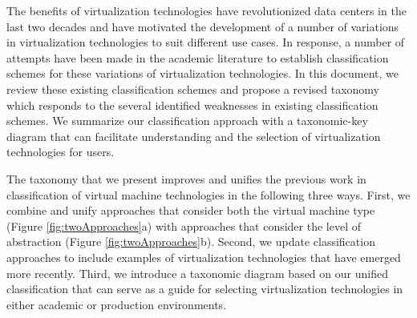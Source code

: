 	
    The benefits of virtualization technologies have revolutionized data centers in the last two decades and have motivated the development of a number of variations in virtualization technologies \cite{Kampert2010} to suit different use cases.  In response, a number of attempts have been made in the academic literature to establish classification schemes for these variations of virtualization technologies.  In this document, we review these existing classification schemes and propose a revised taxonomy which responds to the several identified weaknesses in existing classification schemes. We summarize our classification approach with  a taxonomic-key diagram that can facilitate understanding and the selection of virtualization technologies for users. 
    
    
    
    
    
    The taxonomy that we present improves and unifies the previous work in classification of virtual machine technologies in the following three ways. First, we combine and unify approaches that consider both the virtual machine type  (Figure \ref{fig:twoApproaches}a) with approaches that consider the level of abstraction (Figure \ref{fig:twoApproaches}b). Second, we update classification approaches to include examples of virtualization technologies that have emerged more recently. Third, we introduce a taxonomic diagram based on our unified classification that can serve as a guide for selecting virtualization technologies in either academic or production environments.


